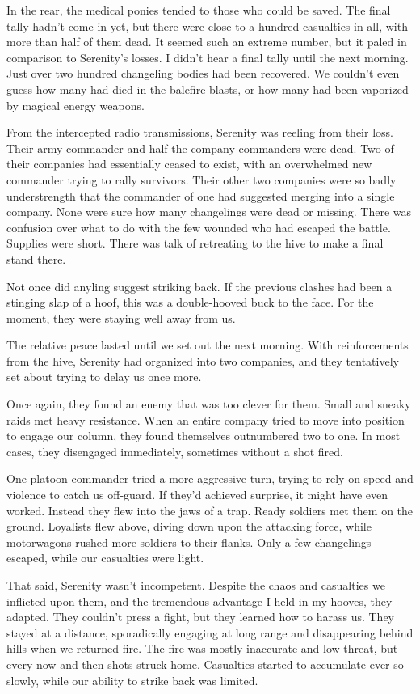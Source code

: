 In the rear, the medical ponies tended to those who could be saved. The final tally hadn’t come in yet, but there were close to a hundred casualties in all, with more than half of them dead. It seemed such an extreme number, but it paled in comparison to Serenity’s losses. I didn’t hear a final tally until the next morning. Just over two hundred changeling bodies had been recovered. We couldn’t even guess how many had died in the balefire blasts, or how many had been vaporized by magical energy weapons.

From the intercepted radio transmissions, Serenity was reeling from their loss. Their army commander and half the company commanders were dead. Two of their companies had essentially ceased to exist, with an overwhelmed new commander trying to rally survivors. Their other two companies were so badly understrength that the commander of one had suggested merging into a single company. None were sure how many changelings were dead or missing. There was confusion over what to do with the few wounded who had escaped the battle. Supplies were short. There was talk of retreating to the hive to make a final stand there.

Not once did anyling suggest striking back. If the previous clashes had been a stinging slap of a hoof, this was a double-hooved buck to the face. For the moment, they were staying well away from us.

{\br}%
The relative peace lasted until we set out the next morning. With reinforcements from the hive, Serenity had organized into two companies, and they tentatively set about trying to delay us once more.

Once again, they found an enemy that was too clever for them. Small and sneaky raids met heavy resistance. When an entire company tried to move into position to engage our column, they found themselves outnumbered two to one. In most cases, they disengaged immediately, sometimes without a shot fired.

One platoon commander tried a more aggressive turn, trying to rely on speed and violence to catch us off-guard. If they’d achieved surprise, it might have even worked. Instead they flew into the jaws of a trap. Ready soldiers met them on the ground. Loyalists flew above, diving down upon the attacking force, while motorwagons rushed more soldiers to their flanks. Only a few changelings escaped, while our casualties were light.

That said, Serenity wasn’t incompetent. Despite the chaos and casualties we inflicted upon them, and the tremendous advantage I held in my hooves, they adapted. They couldn’t press a fight, but they learned how to harass us. They stayed at a distance, sporadically engaging at long range and disappearing behind hills when we returned fire. The fire was mostly inaccurate and low-threat, but every now and then shots struck home. Casualties started to accumulate ever so slowly, while our ability to strike back was limited.

